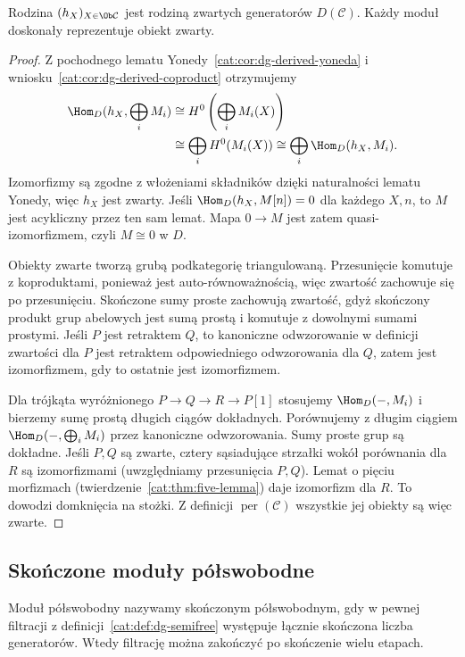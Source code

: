 \begin{twierdzenie}\label{cat:thm:dg-compact-generators}
Rodzina $(h_X)_{X\in\Ob\mathcal C}$ jest rodziną zwartych generatorów $D(\mathcal C)$. Każdy moduł doskonały reprezentuje obiekt zwarty.
\end{twierdzenie}
\begin{proof}
Z pochodnego lematu Yonedy~\ref{cat:cor:dg-derived-yoneda} i wniosku~\ref{cat:cor:dg-derived-coproduct} otrzymujemy
\[
\begin{aligned}
 \Hom_D(h_X,\bigoplus_i M_i)
 &\cong H^0\left(\bigoplus_i M_i(X)\right)\\
 &\cong\bigoplus_i H^0(M_i(X))
 \cong\bigoplus_i\Hom_D(h_X,M_i).
\end{aligned}
\]
Izomorfizmy są zgodne z włożeniami składników dzięki naturalności lematu Yonedy, więc $h_X$ jest zwarty. Jeśli $\Hom_D(h_X,M[n])=0$ dla każdego $X,n$, to $M$ jest acykliczny przez ten sam lemat. Mapa $0\to M$ jest zatem quasi-izomorfizmem, czyli $M\cong0$ w $D$.

Obiekty zwarte tworzą grubą podkategorię triangulowaną. Przesunięcie komutuje z koproduktami, ponieważ jest auto-równoważnością, więc zwartość zachowuje się po przesunięciu. Skończone sumy proste zachowują zwartość, gdyż skończony produkt grup abelowych jest sumą prostą i komutuje z dowolnymi sumami prostymi. Jeśli $P$ jest retraktem $Q$, to kanoniczne odwzorowanie w definicji zwartości dla $P$ jest retraktem odpowiedniego odwzorowania dla $Q$, zatem jest izomorfizmem, gdy to ostatnie jest izomorfizmem.

Dla trójkąta wyróżnionego $P\to Q\to R\to P[1]$ stosujemy $\Hom_D(-,M_i)$ i bierzemy sumę prostą długich ciągów dokładnych. Porównujemy z długim ciągiem $\Hom_D(-,\bigoplus_i M_i)$ przez kanoniczne odwzorowania. Sumy proste grup są dokładne. Jeśli $P,Q$ są zwarte, cztery sąsiadujące strzałki wokół porównania dla $R$ są izomorfizmami (uwzględniamy przesunięcia $P,Q$). Lemat o pięciu morfizmach (twierdzenie~\ref{cat:thm:five-lemma}) daje izomorfizm dla $R$. To dowodzi domknięcia na stożki. Z definicji $\operatorname{per}(\mathcal C)$ wszystkie jej obiekty są więc zwarte.
\end{proof}

\subsection{Skończone moduły półswobodne}

\begin{definicja}\label{cat:def:dg-finite-semifree}
Moduł półswobodny nazywamy skończonym półswobodnym, gdy w pewnej filtracji z definicji~\ref{cat:def:dg-semifree} występuje łącznie skończona liczba generatorów. Wtedy filtrację można zakończyć po skończenie wielu etapach.
\end{definicja}

